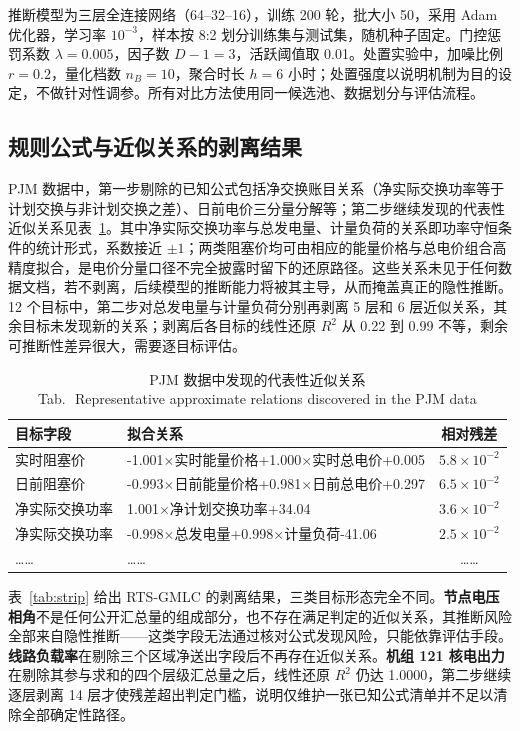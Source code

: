 \documentclass[UTF8,zihao=5,twoside]{ctexart}
\newcommand{\tabbicaption}[2]{\caption{#1\\[-0.2em]\small Tab.\,\thetable\ #2}}
\begin{document}
推断模型为三层全连接网络（64--32--16），训练 200 轮，批大小 50，采用 Adam 优化器\cite{ref-kingma-adam}，学习率 $10^{-3}$，样本按 8:2 划分训练集与测试集，随机种子固定。门控惩罚系数 $\lambda=0.005$，因子数 $D-1=3$，活跃阈值取 0.01。处置实验中，加噪比例 $r=0.2$，量化档数 $n_B=10$，聚合时长 $h=6$ 小时；处置强度以说明机制为目的设定，不做针对性调参。所有对比方法使用同一候选池、数据划分与评估流程。

\subsection{规则公式与近似关系的剥离结果}

PJM 数据中，第一步剔除的已知公式包括净交换账目关系（净实际交换功率等于计划交换与非计划交换之差）、日前电价三分量分解等；第二步继续发现的代表性近似关系见表~\ref{tab:formula}。其中净实际交换功率与总发电量、计量负荷的关系即功率守恒条件的统计形式，系数接近 $\pm 1$；两类阻塞价均可由相应的能量价格与总电价组合高精度拟合，是电价分量口径不完全披露时留下的还原路径。这些关系未见于任何数据文档，若不剥离，后续模型的推断能力将被其主导，从而掩盖真正的隐性推断。12 个目标中，第二步对总发电量与计量负荷分别再剥离 5 层和 6 层近似关系，其余目标未发现新的关系；剥离后各目标的线性还原 $R^2$ 从 0.22 到 0.99 不等，剩余可推断性差异很大，需要逐目标评估。

\begin{table}[!tbp]
\centering
\tabbicaption{PJM 数据中发现的代表性近似关系}{Representative approximate relations discovered in the PJM data}
\label{tab:formula}
\setlength{\tabcolsep}{2.6pt}
\begin{tabular}{p{1.72cm}p{3.62cm}c}
\toprule
目标字段 & 拟合关系 & 相对残差 \\
\midrule
实时阻塞价 & -1.001$\times$实时能量价格+1.000$\times$实时总电价+0.005 & $5.8\times10^{-2}$ \\
日前阻塞价 & -0.993$\times$日前能量价格+0.981$\times$日前总电价+0.297 & $6.5\times10^{-2}$ \\
净实际交换功率 & 1.001$\times$净计划交换功率+34.04 & $3.6\times10^{-2}$ \\
净实际交换功率 & -0.998$\times$总发电量+0.998$\times$计量负荷-41.06 & $2.5\times10^{-2}$ \\
…… & …… & …… \\
\bottomrule
\end{tabular}
\end{table}

表~\ref{tab:strip} 给出 RTS-GMLC 的剥离结果，三类目标形态完全不同。\textbf{节点电压相角}不是任何公开汇总量的组成部分，也不存在满足判定的近似关系，其推断风险全部来自隐性推断——这类字段无法通过核对公式发现风险，只能依靠评估手段。\textbf{线路负载率}在剔除三个区域净送出字段后不再存在近似关系。\textbf{机组 121 核电出力}在剔除其参与求和的四个层级汇总量之后，线性还原 $R^2$ 仍达 1.0000，第二步继续逐层剥离 14 层才使残差超出判定门槛，说明仅维护一张已知公式清单并不足以清除全部确定性路径。
\end{document}
